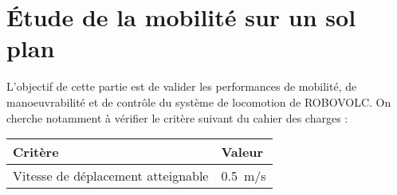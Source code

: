 % 
% 
\section{Étude de la mobilité sur un sol plan \label{sec_2}}


\begin{obj}
L'objectif de cette partie est de valider les performances de mobilité, de manoeuvrabilité et
de contrôle du système de locomotion de ROBOVOLC. On cherche notamment à vérifier le
critère suivant du cahier des charges :

\begin{center}
\begin{tabular}{ll}
\hline
\textbf{Critère} & \textbf{Valeur} \\ \hline \hline
Vitesse de déplacement atteignable &   \SI{0,5}{m/s} \\\hline
\end{tabular}
\end{center}

\end{obj}



